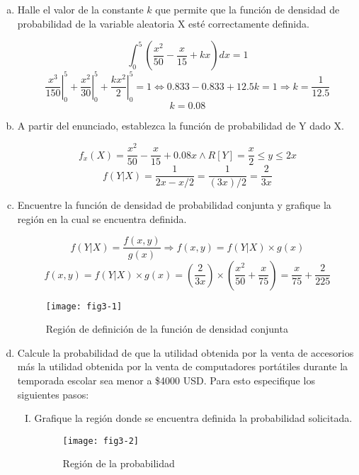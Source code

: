 \documentclass[../main.tex]{subfiles}
\begin{document}
\begin{enumerate}[(a)]

\item Halle el valor de la constante $k$ que permite que la función de densidad
de probabilidad de la variable aleatoria X esté correctamente definida.

$$\int_{0}^{5} \left( \frac{x^2}{50} - \frac{x}{15} + kx\right) dx = 1$$
$$\left.\frac{x^3}{150}\right\vert_{0}^{5} +  \left.\frac{x^2}{30}\right\vert_{0}^{5} + \left.\frac{kx^2}{2}\right\vert_{0}^{5}= 1 \iff 0.833 - 0.833 + 12.5k = 1 \Rightarrow k = \frac{1}{12.5}$$
$$k = 0.08$$

\item A partir del enunciado, establezca la función de probabilidad de Y dado
X.

$$f_{x}(X) = \frac{x^2}{50} - \frac{x}{15} + 0.08x \wedge R[Y] = \frac{x}{2} \leq y \leq 2x$$
$$f(Y | X) =  \frac{1}{2x - x/2} = \frac{1}{(3x)/2} = \frac{2}{3x}$$

\item Encuentre la función de densidad de probabilidad conjunta y grafique la
región en la cual se encuentra definida.

$$f(Y | X) = \frac{f(x, y)}{g(x)} \Rightarrow f(x, y) = f(Y | X) \times g(x)$$
$$f(x, y) = f(Y | X) \times g(x) = \left( \frac{2}{3x}\right) \times \left( \frac{x^2}{50} + \frac{x}{75}  \right) = \frac{x}{75} + \frac{2}{225}$$

\begin{figure}[h]
\centering
\texttt{[image: fig3-1]}
\label{fig:img1}
\caption{Región de definición de la función de densidad conjunta}
\end{figure}

\pagebreak

\item Calcule la probabilidad de que la utilidad obtenida por la venta de
accesorios más la utilidad obtenida por la venta de computadores portátiles durante
la temporada escolar sea menor a \$4000 USD. Para esto especifique los siguientes
pasos:

\begin{enumerate}[(I)]

\item Grafique la región donde se encuentra definida la probabilidad solicitada.

\begin{figure}[h]
\centering
\texttt{[image: fig3-2]}
\label{fig:img1}
\caption{Región de la probabilidad}
\end{figure}


\end{enumerate}
\end{enumerate}
\end{document}
